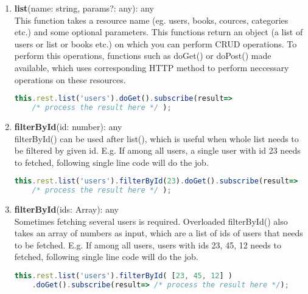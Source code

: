 	
\begin{enumerate}

\item{
	\textbf{list}(name: string, params?: any): any \\
	This function takes a resource name (eg. users, books, cources, categories etc.)  and some optional parameters. This functions return an object (a list of users or list or books etc.) on which you can perform CRUD operations. To perform this operations, functions such as doGet() or doPost() made available, which uses corresponding HTTP method to perform neccessary operations on these resources.
	
\begin{lstlisting}[language=Typescript]
this.rest.list('users').doGet().subscribe(result=> 
	/* process the result here */ );
\end{lstlisting}
	
}
\item{
	\textbf{filterById}(id: number): any \\
	\hspace{0.2in} filterById() can be used after list(), which is useful when whole list needs to be filtered by given id. E.g. If among all users, a single user with id 23 needs to fetched, following single line code will do the job.
	
\begin{lstlisting}[language=Typescript]
this.rest.list('users').filterById(23).doGet().subscribe(result=> 
	/* process the result here */ );
\end{lstlisting}
	
}
\item{
	\textbf{filterById}(ids: Array): any \\
	\hspace{0.2in} Sometimes fetching several users is required. Overloaded filterById() also takes an array of numbers as input, which are a list of ids of users that needs to be fetched. E.g. If among all users, users with ids 23, 45, 12 needs to fetched, following single line code will do the job.
	
\begin{lstlisting}[language=Typescript]
this.rest.list('users').filterById( [23, 45, 12] )
	.doGet().subscribe(result=> /* process the result here */);
\end{lstlisting}
	
}


\end{enumerate}
